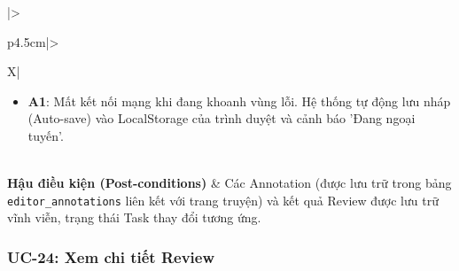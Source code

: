 \begin{table}[H]
\begin{tabularx}{\textwidth}{|>{\raggedright\arraybackslash\bfseries}p{4.5cm}|>{\raggedright\arraybackslash}X|}
\begin{minipage}[t]{\linewidth}
\begin{itemize}[leftmargin=*]
        \item \textbf{A1}: Mất kết nối mạng khi đang khoanh vùng lỗi. Hệ thống tự động lưu nháp (Auto-save) vào LocalStorage của trình duyệt và cảnh báo 'Đang ngoại tuyến'.
    \end{itemize}
\end{minipage} \\ \hline
\textbf{Hậu điều kiện (Post-conditions)} & Các Annotation (được lưu trữ trong bảng \texttt{editor\_annotations} liên kết với trang truyện) và kết quả Review được lưu trữ vĩnh viễn, trạng thái Task thay đổi tương ứng. \\ \hline
\end{tabularx}
\caption{Đặc tả UC-23: Tạo Review cho Submission}
\label{tab:uc23}
\end{table}

\subsubsection{UC-24: Xem chi tiết Review}\label{subsubsec:uc24_view_review}
